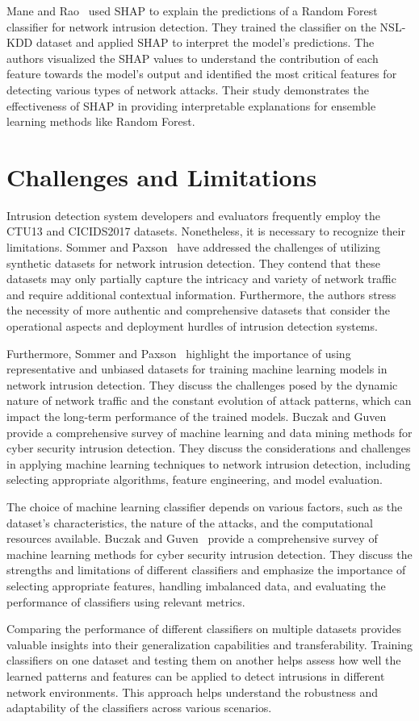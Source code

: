 Mane and Rao~\cite{mane2021explaining} used SHAP to explain the predictions of a Random Forest classifier for network intrusion detection. They trained the classifier on the NSL-KDD dataset and applied SHAP to interpret the model's predictions. The authors visualized the SHAP values to understand the contribution of each feature towards the model's output and identified the most critical features for detecting various types of network attacks. Their study demonstrates the effectiveness of SHAP in providing interpretable explanations for ensemble learning methods like Random Forest.

\section{Challenges and Limitations}
Intrusion detection system developers and evaluators frequently employ the CTU13 and CICIDS2017 datasets. Nonetheless, it is necessary to recognize their limitations. Sommer and Paxson~\cite{sommer2010outside} have addressed the challenges of utilizing synthetic datasets for network intrusion detection. They contend that these datasets may only partially capture the intricacy and variety of network traffic and require additional contextual information. Furthermore, the authors stress the necessity of more authentic and comprehensive datasets that consider the operational aspects and deployment hurdles of intrusion detection systems.

Furthermore, Sommer and Paxson~\cite{sommer2010outside} highlight the importance of using representative and unbiased datasets for training machine learning models in network intrusion detection. They discuss the challenges posed by the dynamic nature of network traffic and the constant evolution of attack patterns, which can impact the long-term performance of the trained models. Buczak and Guven~\cite{buczak2015survey} provide a comprehensive survey of machine learning and data mining methods for cyber security intrusion detection. They discuss the considerations and challenges in applying machine learning techniques to network intrusion detection, including selecting appropriate algorithms, feature engineering, and model evaluation.

The choice of machine learning classifier depends on various factors, such as the dataset's characteristics, the nature of the attacks, and the computational resources available. Buczak and Guven~\cite{buczak2015survey} provide a comprehensive survey of machine learning methods for cyber security intrusion detection. They discuss the strengths and limitations of different classifiers and emphasize the importance of selecting appropriate features, handling imbalanced data, and evaluating the performance of classifiers using relevant metrics.

Comparing the performance of different classifiers on multiple datasets provides valuable insights into their generalization capabilities and transferability. Training classifiers on one dataset and testing them on another helps assess how well the learned patterns and features can be applied to detect intrusions in different network environments. This approach helps understand the robustness and adaptability of the classifiers across various scenarios.
